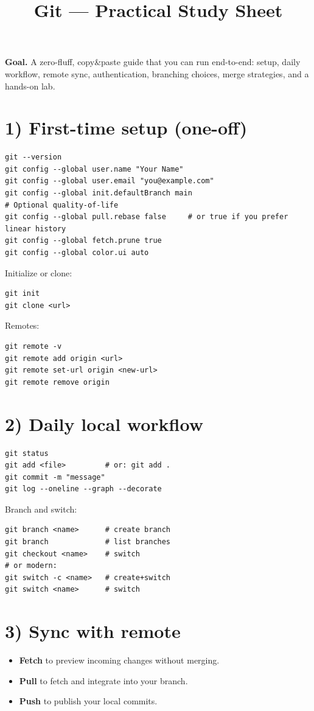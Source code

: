 \documentclass[11pt]{article}
\title{Git — Practical Study Sheet}
\author{}
\date{}
\begin{document}
\maketitle

\noindent\textbf{Goal.} A zero-fluff, copy\&paste guide that you can run end-to-end: setup, daily workflow, remote sync, authentication, branching choices, merge strategies, and a hands-on lab.

\section*{1) First-time setup (one-off)}
\begin{verbatim}
git --version
git config --global user.name "Your Name"
git config --global user.email "you@example.com"
git config --global init.defaultBranch main
# Optional quality-of-life
git config --global pull.rebase false     # or true if you prefer linear history
git config --global fetch.prune true
git config --global color.ui auto
\end{verbatim}

\noindent Initialize or clone:
\begin{verbatim}
git init
git clone <url>
\end{verbatim}

\noindent Remotes:
\begin{verbatim}
git remote -v
git remote add origin <url>
git remote set-url origin <new-url>
git remote remove origin
\end{verbatim}
\clearpage

\section*{2) Daily local workflow}
\begin{verbatim}
git status
git add <file>         # or: git add .
git commit -m "message"
git log --oneline --graph --decorate
\end{verbatim}

\noindent Branch and switch:
\begin{verbatim}
git branch <name>      # create branch
git branch             # list branches
git checkout <name>    # switch
# or modern:
git switch -c <name>   # create+switch
git switch <name>      # switch
\end{verbatim}

\section*{3) Sync with remote}
\begin{itemize}
  \item \textbf{Fetch} to preview incoming changes without merging.
  \item \textbf{Pull} to fetch and integrate into your branch.
  \item \textbf{Push} to publish your local commits.
\end{itemize}
\end{document}

